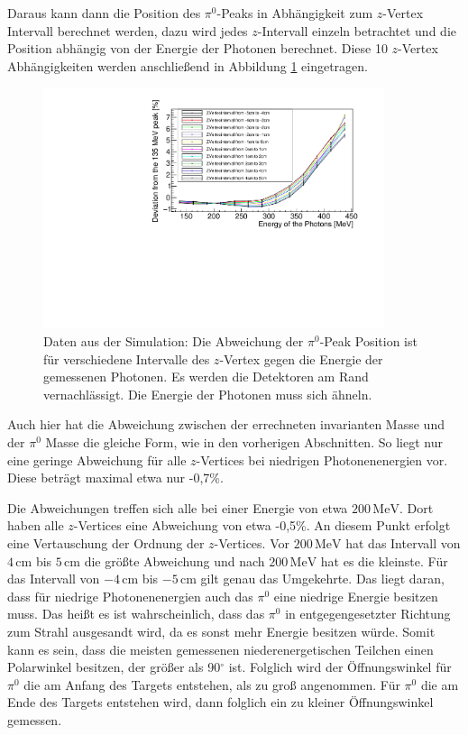 \documentclass[a4paper,11pt,oneside,final,german,openbib,pdftex]{scrbook}
\begin{document}
{Daraus kann dann die Position des $\pi^0$-Peaks in Abhängigkeit zum $z$-Vertex Intervall berechnet werden, dazu wird jedes $z$-Intervall einzeln betrachtet und die Position abhängig von der Energie der Photonen berechnet. 
Diese 10 $z$-Vertex Abhängigkeiten werden anschließend in Abbildung \ref{fig:Z-Vertex-Multi-Graph} eingetragen.

\begin{figure}[h!]
	\begin{center}
		\includegraphics[width=100mm]{20172804MCZVertexDeviation}
		\caption[Simulation: Abweichung f\"ur verschiedene $z$-Vertices]{Daten aus der Simulation: Die Abweichung der $\pi^0$-Peak Position ist für verschiedene Intervalle des $z$-Vertex gegen die Energie der gemessenen Photonen. Es werden die Detektoren am Rand vernachl\"assigt. Die Energie der Photonen muss sich \"ahneln.}
		\label{fig:Z-Vertex-Multi-Graph}
	\end{center}
\end{figure}

Auch hier hat die Abweichung zwischen der errechneten invarianten Masse und der $\pi^0$ Masse die gleiche Form, wie in den vorherigen Abschnitten. So liegt nur eine geringe Abweichung f\"ur alle $z$-Vertices bei niedrigen Photonenenergien vor. Diese betr\"agt maximal etwa nur -0,7\%. 

Die Abweichungen treffen sich alle bei einer Energie von etwa $200\,\text{MeV}$. Dort haben alle $z$-Vertices eine Abweichung von etwa -0,5\%. An diesem Punkt erfolgt eine Vertauschung der Ordnung der $z$-Vertices. Vor $200\,\text{MeV}$ hat das Intervall von $4\,\text{cm}$ bis $5\,\text{cm}$ die gr\"o{\ss}te Abweichung und nach $200\,\text{MeV}$ hat es die kleinste. F\"ur das Intervall von $-4\,\text{cm}$ bis $-5\,\text{cm}$ gilt genau das Umgekehrte. Das liegt daran, dass f\"ur niedrige Photonenenergien auch das $\pi^0$ eine niedrige Energie besitzen muss. Das hei{\ss}t es ist wahrscheinlich, dass das $\pi^0$ in entgegengesetzter Richtung zum Strahl ausgesandt wird, da es sonst mehr Energie besitzen w\"urde. Somit kann es sein, dass die meisten gemessenen niederenergetischen Teilchen einen Polarwinkel besitzen, der gr\"o{\ss}er als 90$^{\circ}$ ist. Folglich wird der \"Offnungswinkel f\"ur $\pi^0$ die am Anfang des Targets entstehen, als zu gro{\ss} angenommen. F\"ur $\pi^0$ die am Ende des Targets entstehen wird, dann folglich ein zu kleiner \"Offnungswinkel gemessen. 

}
\end{document}
